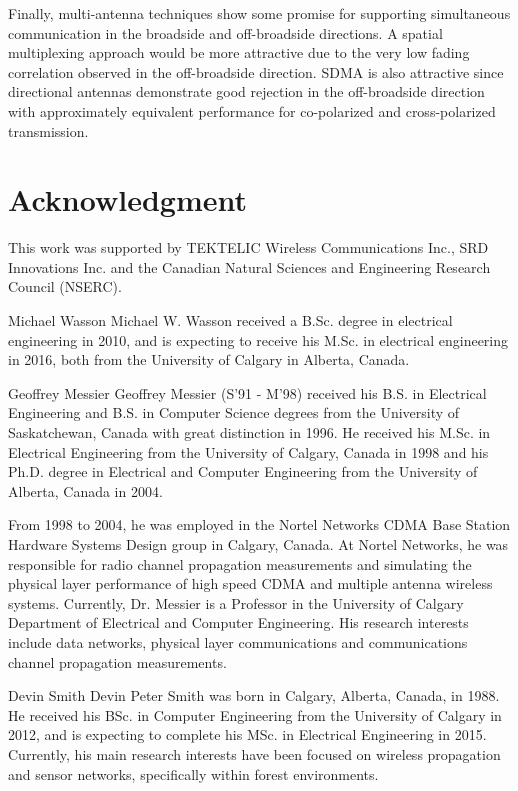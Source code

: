 \documentclass[12pt]{IEEEtran}
\begin{document}
Finally, multi-antenna techniques show some promise for supporting simultaneous communication in the broadside and off-broadside directions.  A spatial multiplexing approach would be more attractive due to the very low fading correlation observed in the off-broadside direction. SDMA is also attractive since directional antennas demonstrate good rejection in the off-broadside direction with approximately equivalent performance for co-polarized and cross-polarized transmission.


\section*{Acknowledgment}

This work was supported by TEKTELIC Wireless Communications Inc., SRD Innovations Inc. and the Canadian Natural Sciences and Engineering Research Council (NSERC).

\printbibliography




\begin{IEEEbiography}
  {Michael Wasson}
Michael W. Wasson received a B.Sc. degree in electrical engineering in 2010, and is expecting to receive his M.Sc. in electrical engineering in 2016, both from the University of Calgary in Alberta, Canada. 
\end{IEEEbiography}


\begin{IEEEbiography}
  {Geoffrey Messier}
Geoffrey Messier (S'91 - M'98) received his B.S. in Electrical
Engineering and B.S. in Computer Science degrees from the University of
Saskatchewan, Canada with great distinction in 1996.  He received his
M.Sc. in Electrical Engineering from the University of Calgary, Canada
in 1998 and his Ph.D. degree in Electrical and Computer Engineering from
the University of Alberta, Canada in 2004.

From 1998 to 2004, he was employed in the Nortel Networks CDMA Base
Station Hardware Systems Design group in Calgary, Canada.  At Nortel
Networks, he was responsible for radio channel propagation measurements
and simulating the physical layer performance of high speed CDMA and
multiple antenna wireless systems.  Currently, Dr. Messier is a
Professor in the University of Calgary Department of
Electrical and Computer Engineering.  His research interests include
data networks, physical layer communications and communications
channel propagation measurements.
\end{IEEEbiography}


\begin{IEEEbiography}
  {Devin Smith}
Devin Peter Smith was born in Calgary, Alberta, Canada, in 1988. He received his BSc. in Computer Engineering from the University of Calgary in 2012, and is expecting to complete his MSc. in Electrical Engineering in 2015.  Currently, his main research interests have been focused on wireless propagation and sensor networks, specifically within forest environments.
\end{IEEEbiography}
\end{document}
